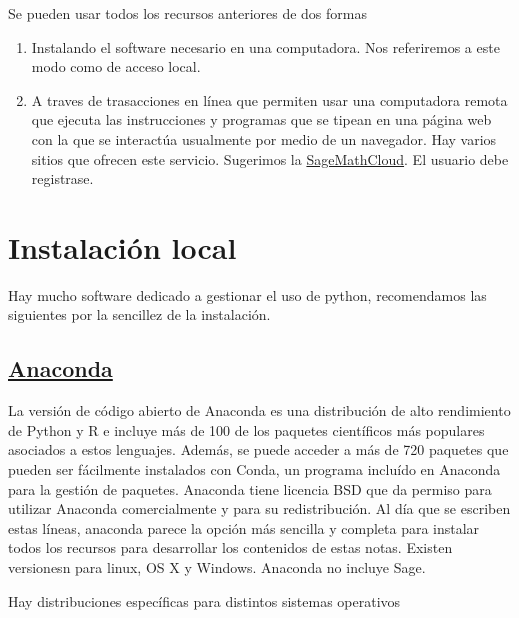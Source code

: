 Se pueden usar todos los recursos anteriores de dos formas
\begin{enumerate}
\item Instalando el software necesario en una computadora. Nos referiremos a este modo como de acceso local.

\item A traves de trasacciones en línea que permiten usar una computadora remota que ejecuta las instrucciones y programas que se tipean en una página web con la que se interactúa usualmente por medio de un navegador.  Hay varios sitios que ofrecen este servicio. Sugerimos la \href{https://cloud.sagemath.com/}{SageMathCloud}. El usuario debe registrase.
\end{enumerate}



\section{Instalación local}


Hay mucho software dedicado a gestionar el uso de python, recomendamos las siguientes 
por la sencillez de la instalación.  

\subsection{\href{https://www.continuum.io/downloads}{Anaconda}} 
La versión de código abierto de Anaconda es una distribución de alto rendimiento de Python y R 
e incluye más de 100 de los paquetes científicos más populares asociados a estos lenguajes.
\reversemarginpar{} Además, se puede acceder a más de 720 paquetes que pueden ser fácilmente instalados con Conda, 
 un programa incluído en Anaconda para la gestión de paquetes.
 Anaconda tiene licencia BSD que da permiso para utilizar Anaconda comercialmente 
 y para su redistribución. Al día que se escriben estas líneas, anaconda parece la opción más 
 sencilla y completa para instalar todos los recursos para desarrollar los contenidos de 
 estas notas. Existen versionesn para linux, OS X y Windows. Anaconda no incluye Sage.

 Hay distribuciones específicas para distintos sistemas operativos

